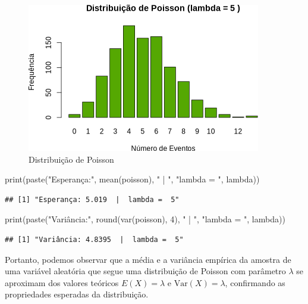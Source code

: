 \documentclass[
]{article}
\newenvironment{Shaded}{\begin{snugshade}}{\end{snugshade}}
\newcommand{\DecValTok}[1]{\textcolor[rgb]{0.00,0.00,0.81}{#1}}
\newcommand{\FunctionTok}[1]{\textcolor[rgb]{0.00,0.00,0.00}{#1}}
\newcommand{\NormalTok}[1]{#1}
\newcommand{\StringTok}[1]{\textcolor[rgb]{0.31,0.60,0.02}{#1}}
\begin{document}
\begin{figure}

{\centering \includegraphics{7_activity_files/figure-latex/poisson-plot-1} 

}

\caption{Distribuição de Poisson}\label{fig:poisson-plot}
\end{figure}

\begin{Shaded}
\begin{Highlighting}[]
\FunctionTok{print}\NormalTok{(}\FunctionTok{paste}\NormalTok{(}\StringTok{"Esperança:"}\NormalTok{, }\FunctionTok{mean}\NormalTok{(poisson), }\StringTok{" | "}\NormalTok{, }\StringTok{"lambda = "}\NormalTok{, lambda))}
\end{Highlighting}
\end{Shaded}

\begin{verbatim}
## [1] "Esperança: 5.019  |  lambda =  5"
\end{verbatim}

\begin{Shaded}
\begin{Highlighting}[]
\FunctionTok{print}\NormalTok{(}\FunctionTok{paste}\NormalTok{(}\StringTok{"Variância:"}\NormalTok{, }\FunctionTok{round}\NormalTok{(}\FunctionTok{var}\NormalTok{(poisson), }\DecValTok{4}\NormalTok{), }\StringTok{" | "}\NormalTok{, }\StringTok{"lambda = "}\NormalTok{, lambda))}
\end{Highlighting}
\end{Shaded}

\begin{verbatim}
## [1] "Variância: 4.8395  |  lambda =  5"
\end{verbatim}

Portanto, podemos observar que a média e a variância empírica da amostra de uma variável aleatória que segue uma distribuição de Poisson com parâmetro \(\lambda\) se aproximam dos valores teóricos \(E(X) = \lambda\) e \(\text{Var}(X) = \lambda\), confirmando as propriedades esperadas da distribuição.
\end{document}
